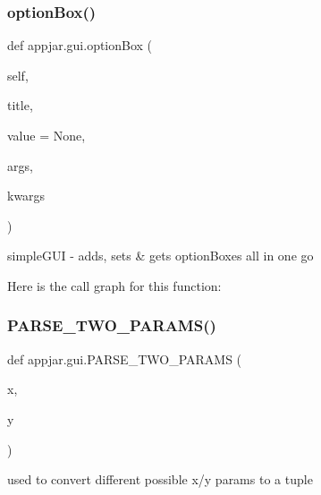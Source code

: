 \begin{DoxyVerb}
\subsubsection{\texorpdfstring{option\+Box()}{optionBox()}}
{\footnotesize\ttfamily def appjar.\+gui.\+option\+Box (\begin{DoxyParamCaption}\item[{}]{self,  }\item[{}]{title,  }\item[{}]{value = {\ttfamily None},  }\item[{}]{args,  }\item[{}]{kwargs }\end{DoxyParamCaption})}

\begin{DoxyVerb}simpleGUI - adds, sets & gets optionBoxes all in one go \end{DoxyVerb}
 Here is the call graph for this function\+:
\mbox{\label{classappjar_1_1gui_a939ff1df33b313c7c1c1810c4901b927}} 
\subsubsection{\texorpdfstring{P\+A\+R\+S\+E\+\_\+\+T\+W\+O\+\_\+\+P\+A\+R\+A\+M\+S()}{PARSE\_TWO\_PARAMS()}}
{\footnotesize\ttfamily def appjar.\+gui.\+P\+A\+R\+S\+E\+\_\+\+T\+W\+O\+\_\+\+P\+A\+R\+A\+MS (\begin{DoxyParamCaption}\item[{}]{x,  }\item[{}]{y }\end{DoxyParamCaption})\hspace{0.3cm}{\ttfamily [static]}}

\begin{DoxyVerb}used to convert different possible x/y params to a tuple
\end{DoxyVerb}
 \mbox{\label{classappjar_1_1gui_a59d1942dcaf3c876081d709c7249faf5}} 

\end{DoxyVerb}
